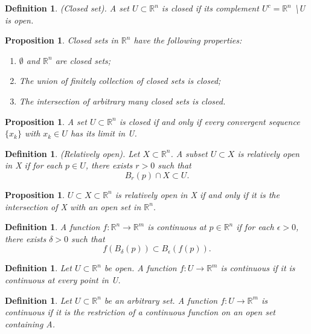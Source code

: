 \documentclass[twoside]{article}
\newtheorem{proposition}[theorem]{Proposition}
\newtheorem{definition}[theorem]{Definition}
\begin{document}
\begin{definition}(Closed set). A set $U \subset \mathbb{R}^n$ is closed if its complement $U^c = \mathbb{R}^n$ \textbackslash U is open.
\end{definition}

\begin{proposition}Closed sets in $\mathbb{R}^n$ have the following properties:
\begin{enumerate}
    \item $\emptyset$ and $\mathbb{R}^n$ are closed sets;
    \item The union of finitely collection of closed sets is closed;
    \item The intersection of arbitrary many closed sets is closed.
\end{enumerate}
\end{proposition}

\begin{proposition}A set $U \subset \mathbb{R}^n$ is closed if and only if every convergent sequence $\{x_k\}$ with $x_k \in U$ has its limit in U.
\end{proposition}


\begin{definition}(Relatively open). Let $X \subset \mathbb{R}^n$. A subset $U \subset X$ is relatively open in X if for each $p \in U$, there exists $r > 0$ such that $$B_r(p) \cap X \subset U.$$
\end{definition}

\begin{proposition}$U \subset X \subset \mathbb{R}^n$ is relatively open in X if and only if it is the intersection of X with an open set in $\mathbb{R}^n.$
\end{proposition}

\begin{definition}A function $f: \mathbb{R}^n \rightarrow \mathbb{R}^m$ is continuous at $p \in \mathbb{R}^n$ if for each $\epsilon > 0$, there exists $\delta > 0$ such that 
$$
f(B_{\delta}(p)) \subset B_{\epsilon}(f(p)).
$$
\end{definition}

\begin{definition}Let $ U \subset \mathbb{R}^n$ be open. A function $f: U \rightarrow \mathbb{R}^m$ is continuous if it is continuous at every point in U.
\end{definition}

\begin{definition}Let $ U \subset \mathbb{R}^n$ be an arbitrary set. A function $f: U \rightarrow \mathbb{R}^m$ is continuous if it is the restriction of a continuous function on an open set containing A.
\end{definition}
\end{document}
